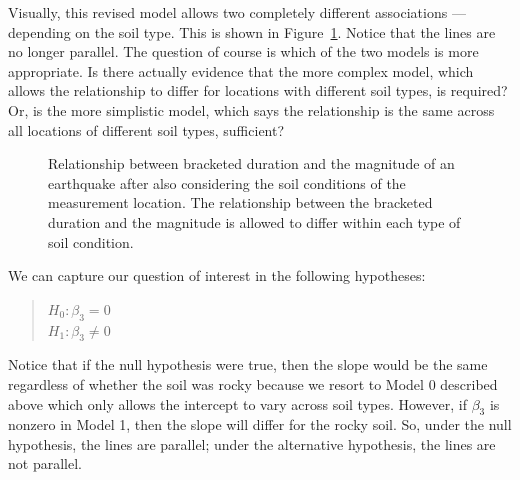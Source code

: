 \documentclass[
  letterpaper,
  DIV=11,
  numbers=noendperiod]{scrreprt}
\theoremstyle{definition}
\theoremstyle{definition}
\theoremstyle{plain}
\theoremstyle{remark}
\begin{document}
Visually, this revised model allows two completely different
associations --- depending on the soil type. This is shown in
Figure~\ref{fig-regextensions-int-plot}. Notice that the lines are no
longer parallel. The question of course is which of the two models is
more appropriate. Is there actually evidence that the more complex
model, which allows the relationship to differ for locations with
different soil types, is required? Or, is the more simplistic model,
which says the relationship is the same across all locations of
different soil types, sufficient?

\begin{figure}


\caption{\label{fig-regextensions-int-plot}Relationship between
bracketed duration and the magnitude of an earthquake after also
considering the soil conditions of the measurement location. The
relationship between the bracketed duration and the magnitude is allowed
to differ within each type of soil condition.}

\end{figure}%

We can capture our question of interest in the following hypotheses:

\begin{quote}
\(H_0: \beta_3 = 0\)\\
\(H_1: \beta_3 \neq 0\)
\end{quote}

Notice that if the null hypothesis were true, then the slope would be
the same regardless of whether the soil was rocky because we resort to
Model 0 described above which only allows the intercept to vary across
soil types. However, if \(\beta_3\) is nonzero in Model 1, then the
slope will differ for the rocky soil. So, under the null hypothesis, the
lines are parallel; under the alternative hypothesis, the lines are not
parallel.
\end{document}
